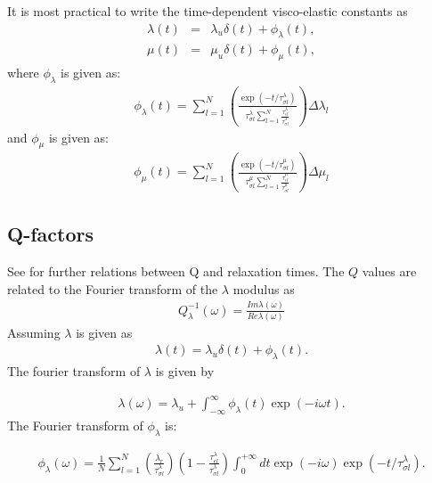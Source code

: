 \documentclass[11pt]{article}
\begin{document}
It is most practical to write the time-dependent visco-elastic constants as
\begin{eqnarray}
  \lambda(t) & = & \lambda_u \delta(t) + \phi_{\lambda}(t), \\
  \mu(t)    &  =  &\mu_u\delta(t)+\phi_{\mu}(t),
\end{eqnarray}
where
%
$\phi_{\lambda}$ is given as:
\begin{eqnarray}
  \phi_{\lambda}(t) = \sum_{l=1}^N 
  \left(\frac{\exp(-t/\tau^{\lambda}_{\sigma l})}{\tau^{\lambda}_{\sigma l}\sum_{l=1}^N \frac{\tau^{\lambda}_{\epsilon l}}{\tau^{\lambda}_{\sigma l}}}\right)
            \Delta \lambda_l
\end{eqnarray}
%
and $\phi_{\mu}$ is given as:
\begin{eqnarray}
  \phi_{\mu}(t) = \sum_{l=1}^N 
  \left(\frac{\exp(-t/\tau^{\mu}_{\sigma l})}{\tau^{\mu}_{\sigma l}\sum_{l=1}^N \frac{\tau^{\mu}_{\epsilon l}}{\tau^{\mu}_{\sigma l}}}\right)
            \Delta \mu_l
\end{eqnarray}
\subsection*{Q-factors}
See \cite{Casula1992} for further relations between Q and relaxation times.
The $Q$ values are related to the Fourier transform of the $\lambda$ modulus as
\begin{eqnarray}
  Q^{-1}_{\lambda}(\omega) = \frac{Im \lambda(\omega)}{Re \lambda(\omega)}
\end{eqnarray}
Assuming $\lambda$ is given as
\begin{eqnarray}
\lambda(t) = \lambda_u\delta(t) + \phi_{\lambda}(t).
\end{eqnarray}
The fourier transform of $\lambda$ is given by

\begin{eqnarray}
\lambda(\omega) = \lambda_u + \int_{-\infty}^{\infty} \phi_{\lambda}(t) \exp(-i\omega t).
\end{eqnarray}
The Fourier transform of $\phi_\lambda$ is:

\begin{eqnarray}
\phi_{\lambda}(\omega)=  \frac{1}{N}\sum_{l=1}^N\left(\frac{\lambda_r}{\tau^{\lambda}_{\sigma l}}\right) 
            \left(1-\frac{\tau^{\lambda}_{\epsilon l}}{\tau^{\lambda}_{\sigma l}}\right)
           \int^{+\infty}_0 dt\exp(-i\omega)\exp(-t/\tau^{\lambda}_{\sigma l}).
\end{eqnarray}
\end{document}
